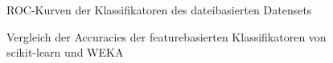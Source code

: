 \begin{figure}
  \caption{ROC-Kurven der Klassifikatoren des dateibasierten Datensets}
\end{figure}

\begin{figure}
  \centering
  \caption{Vergleich der Accuracies der featurebasierten Klassifikatoren von scikit-learn und WEKA\label{fig:final-feat}}
\end{figure}

